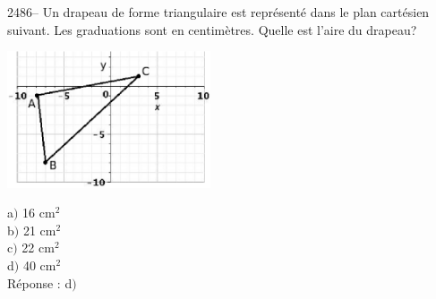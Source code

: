 \documentclass[letterpaper, 12pt]{article}
\begin{document}
2486-- Un drapeau de forme triangulaire est repr\'esent\'e dans le plan cart\'esien suivant. Les graduations sont en centim\`etres. Quelle est l'aire du drapeau?\\
\begin{center}
 \includegraphics[width=6cm,bb=14 14 406 276]{Q2486.eps}
\end{center}

a$)$ 16 cm$^{2}$\\
b$)$ 21 cm$^{2}$\\
c$)$ 22 cm$^{2}$\\
d$)$ 40 cm$^{2}$\\

R\'eponse : d$)$\\
\end{document}
